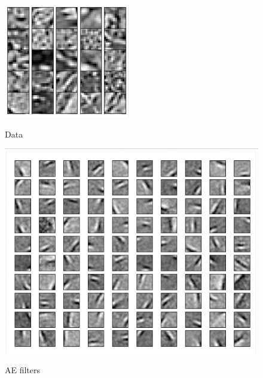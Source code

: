 \begin{frame}
    \begin{figure}
        \includegraphics[width=\linewidth]{images/data.png}
        \label{fig:awesome_image1}
        \caption{Data}
    \endminipage\hfill
        \includegraphics[width=\linewidth]{images/ae-filters.png}
        \label{fig:awesome_image2}
        \caption{AE filters}
    \endminipage\hfill

\end{figure}
\end{frame}
